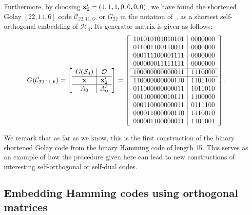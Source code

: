 \documentclass{article}
\theoremstyle{definition}
\theoremstyle{remark}
\begin{document}
Furthermore, by choosing ${\bf{x}}_2' =(1, 1, 1, 0, 0, 0, 0)$, we have found the shortened Golay $[22, 11, 6]$ code $\mathcal C_{22,11,6}$, or $G_{22}$ in the notation of~\cite{Pless1975}, as a shortest self-orthogonal embedding of $\mathcal H_4$. Its generator matrix is given as follows:
\[
G(\mathcal C_{22,11,6})
= \left[ \begin{array}{c|c}
G(\mathcal S_4) & \mathcal{O} \\
\hline
{\bf{x}} & {\bf{x}}_2'\\
\hline
A_0   & A_0' \\
\end{array}
\right] = \left[
\begin{array}{c|c}
1 0 1 0 1 0 1 0 1 0 1 0 1 0 1 & 0 0 0 0 0 0 0\\
0 1 1 0 0 1 1 0 0 1 1 0 0 1 1 & 0 0 0 0 0 0 0\\
0 0 0 1 1 1 1 0 0 0 0 1 1 1 1 & 0 0 0 0 0 0 0\\
0 0 0 0 0 0 0 1 1 1 1 1 1 1 1 & 0 0 0 0 0 0 0\\
\hline
1 0 0 0 0 0 0 0 0 0 0 0 0 1 1 & 1 1 1 0 0 0 0 \\
\hline
1 1 0 0 0 0 0 0 0 0 0 0 1 1 0 & 1 1 0 1 1 0 0 \\
0 1 1 0 0 0 0 0 0 0 0 0 0 1 1 & 1 0 1 1 0 1 0 \\
0 0 1 1 0 0 0 0 0 0 1 0 1 1 1 & 1 1 0 0 0 0 0 \\
0 0 0 1 1 0 0 0 0 0 0 0 0 1 1 & 0 1 1 1 1 0 0 \\
0 0 0 0 1 1 0 0 0 0 0 0 1 1 0 & 1 1 1 0 0 1 0 \\
0 0 0 0 0 1 1 0 0 0 0 0 0 1 1 & 1 1 0 1 0 0 1 \\
\end{array}
\right].
\]

We remark that as far as we know, this is the first construction of the binary shortened Golay code from the binary Hamming code of length 15. This serves as an example of how the procedure given here can lead to new constructions of interesting self-orthogonal or self-dual codes.



\subsection{Embedding Hamming codes using orthogonal matrices}
\end{document}

